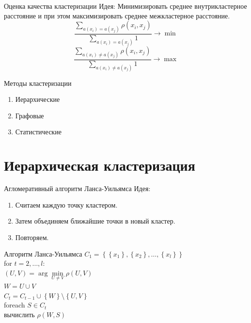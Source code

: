 \documentclass[10pt]{beamer}
\begin{document}
\begin{frame}{Оценка качества кластеризации}
  \alert{Идея}: Минимизировать среднее внутрикластерное расстояние и при этом максимизировать среднее межкластерное расстояние.
	\bigbreak
	$${\frac{\sum\limits_{a(x_i) = a(x_j)} \rho(x_i, x_j)}{\sum\limits_{a(x_i) = a(x_j)} 1} \rightarrow \min}$$
	\bigbreak
	$${\frac{\sum\limits_{a(x_i) \neq a(x_j)} \rho(x_i, x_j)}{\sum\limits_{a(x_i) \neq a(x_j)} 1} \rightarrow \max}$$
\end{frame}


\begin{frame}{Методы кластеризации}
	\begin{enumerate} [-]
		\item Иерархические
		\item Графовые 
		\item Статистические 
	\end{enumerate}
\end{frame}

\section{Иерархическая кластеризация}

\begin{frame}{Агломеративный алгоритм Ланса-Уильямса}
	\alert{Идея}:\\
	\begin{enumerate}
		\item Считаем каждую точку кластером. 
		\item Затем объединяем ближайшие точки в новый кластер. 
		\item Повторяем.
	\end{enumerate}
\end{frame}


\begin{frame}{Алгоритм Ланса-Уильямса}
	${C_1 = \left\{ \left\{ x_1\right\}, \left\{x_2 \right\}, \dots, \left\{x_l \right\} \right\}}$\\
	for ${t=2, \dots, l }$:\\
	\hspace{5mm} ${(U, V) = \arg\min\limits_{U \neq V} \rho(U, V)}$\\
	\hspace{5mm} $W = U \cup V$\\
	\hspace{5mm} ${C_t = C_{t-1} \cup \left\{ W \right\}\setminus \left\{U, V \right\} }$\\
	\hspace{5mm} foreach ${S \in C_t}$\\
	\hspace{10mm}   вычислить $\rho(W, S)$\\
\end{frame}
\end{document}
